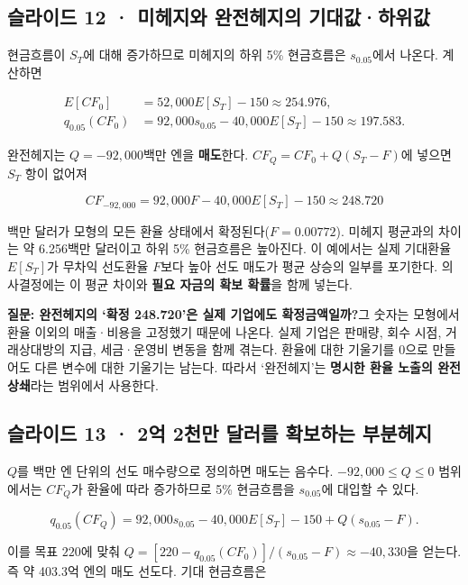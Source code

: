 \documentclass[11pt,a4paper]{article}
\begin{document}
\subsection{슬라이드 12 · 미헤지와 완전헤지의 기대값·하위값}
현금흐름이 $S_T$에 대해 증가하므로 미헤지의 하위 5\% 현금흐름은 $s_{0.05}$에서 나온다. 계산하면\par

\[
\begin{aligned}
E[CF_0]&=52{,}000E[S_T]-150\approx254.976,\\
q_{0.05}(CF_0)&=92{,}000s_{0.05}-40{,}000E[S_T]-150\approx197.583.
\end{aligned}
\]

완전헤지는 $Q=-92{,}000$백만 엔을 \textbf{매도}한다. $CF_Q=CF_0+Q(S_T-F)$에 넣으면 $S_T$ 항이 없어져\par

\[
CF_{-92{,}000}=92{,}000F-40{,}000E[S_T]-150\approx248.720
\]

백만 달러가 모형의 모든 환율 상태에서 확정된다($F=0.00772$). 미헤지 평균과의 차이는 약 6.256백만 달러이고 하위 5\% 현금흐름은 높아진다. 이 예에서는 실제 기대환율 $E[S_T]$가 무차익 선도환율 $F$보다 높아 선도 매도가 평균 상승의 일부를 포기한다. 의사결정에는 이 평균 차이와 \textbf{필요 자금의 확보 확률}을 함께 넣는다.\par

\par\medskip\noindent\textbf{질문: 완전헤지의 ‘확정 248.720’은 실제 기업에도 확정금액일까?}\quad 그 숫자는 모형에서 환율 이외의 매출·비용을 고정했기 때문에 나온다. 실제 기업은 판매량, 회수 시점, 거래상대방의 지급, 세금·운영비 변동을 함께 겪는다. 환율에 대한 기울기를 0으로 만들어도 다른 변수에 대한 기울기는 남는다. 따라서 ‘완전헤지’는 \textbf{명시한 환율 노출의 완전 상쇄}라는 범위에서 사용한다.\par

\subsection{슬라이드 13 · 2억 2천만 달러를 확보하는 부분헤지}
$Q$를 백만 엔 단위의 선도 매수량으로 정의하면 매도는 음수다. $-92{,}000\leq Q\leq0$ 범위에서는 $CF_Q$가 환율에 따라 증가하므로 5\% 현금흐름을 $s_{0.05}$에 대입할 수 있다.\par

\[
q_{0.05}(CF_Q)=92{,}000s_{0.05}-40{,}000E[S_T]-150+Q(s_{0.05}-F).
\]

이를 목표 $220$에 맞춰 $Q=[220-q_{0.05}(CF_0)]/(s_{0.05}-F)\approx-40{,}330$을 얻는다. 즉 약 403.3억 엔의 매도 선도다. 기대 현금흐름은\par
\end{document}
